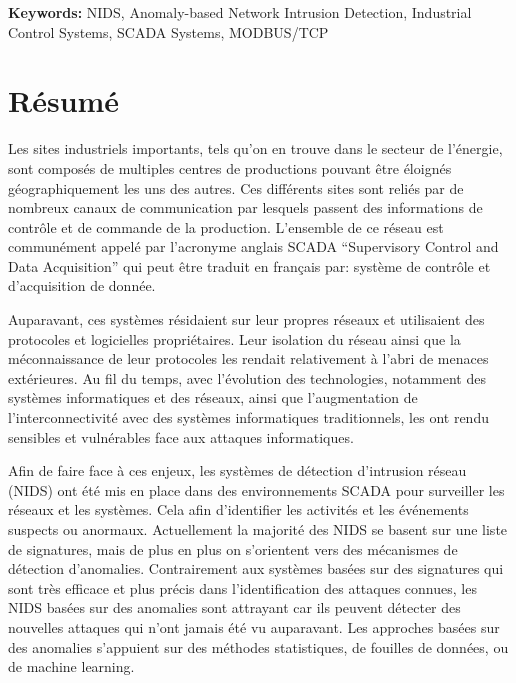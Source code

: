 \documentclass[11pt,a4paper]{article}
\begin{document}
\bigskip
\bigskip
\textbf{Keywords: } NIDS, Anomaly-based Network Intrusion Detection,
Industrial Control Systems, SCADA Systems, MODBUS/TCP

\newpage
\mbox{} \thispagestyle{empty}

\clearpage

\section*{Résumé}\label{resume}

Les sites industriels importants, tels qu'on en trouve dans le secteur
de l'énergie, sont composés de multiples centres de productions pouvant
être éloignés géographiquement les uns des autres. Ces différents sites
sont reliés par de nombreux canaux de communication par lesquels passent
des informations de contrôle et de commande de la production. L'ensemble
de ce réseau est communément appelé par l'acronyme anglais SCADA
``Supervisory Control and Data Acquisition'' qui peut être traduit en
français par: système de contrôle et d'acquisition de donnée.

Auparavant, ces systèmes résidaient sur leur propres réseaux et
utilisaient des protocoles et logicielles propriétaires. Leur isolation
du réseau ainsi que la méconnaissance de leur protocoles les rendait
relativement à l'abri de menaces extérieures. Au fil du temps, avec
l'évolution des technologies, notamment des systèmes informatiques et
des réseaux, ainsi que l'augmentation de l'interconnectivité avec des
systèmes informatiques traditionnels, les ont rendu sensibles et
vulnérables face aux attaques informatiques.

Afin de faire face à ces enjeux, les systèmes de détection d'intrusion
réseau (NIDS) ont été mis en place dans des environnements SCADA pour
surveiller les réseaux et les systèmes. Cela afin d'identifier les
activités et les événements suspects ou anormaux. Actuellement la
majorité des NIDS se basent sur une liste de signatures, mais de plus en
plus on s'orientent vers des mécanismes de détection d'anomalies.
Contrairement aux systèmes basées sur des signatures qui sont très
efficace et plus précis dans l'identification des attaques connues, les
NIDS basées sur des anomalies sont attrayant car ils peuvent détecter
des nouvelles attaques qui n'ont jamais été vu auparavant. Les approches
basées sur des anomalies s'appuient sur des méthodes statistiques, de
fouilles de données, ou de machine learning.
\end{document}
